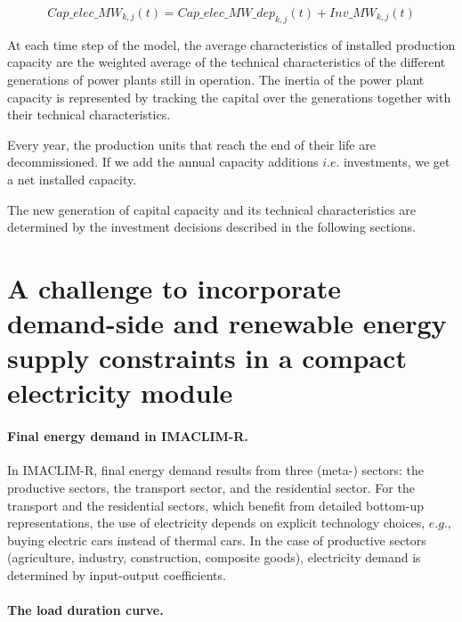 \begin{dmath}
    Cap\_elec\_MW_{k,j}(t) = Cap\_elec\_MW\_dep_{k,j}(t) + Inv\_MW_{k,j}(t)
    \label{eqn:Cap_elec}
\end{dmath}




At each time step of the model, the average characteristics of installed production capacity are the weighted average of the technical characteristics of the different generations of power plants still in operation.
The inertia of the power plant capacity is represented by tracking the capital over the generations together with their technical characteristics.

Every year, the production units that reach the end of their life are decommissioned.
If we add the annual capacity additions $i.e.$ investments, we get a net installed capacity.

The new generation of capital capacity and its technical characteristics are determined by the investment decisions described in the following sections.
\section{A challenge to incorporate demand-side and renewable energy supply constraints in a compact electricity module}

\paragraph{Final energy demand in IMACLIM-R.}

In IMACLIM-R, final energy demand results from three (meta-) sectors: the productive sectors, the transport sector, and the residential sector. For the transport and the residential sectors, which benefit from detailed bottom-up representations, the use of electricity depends on explicit technology choices, $e.g.$, buying electric cars instead of thermal cars. In the case of productive sectors (agriculture, industry, construction, composite goods), electricity demand is determined by input-output coefficients.

\paragraph{The load duration curve.}



